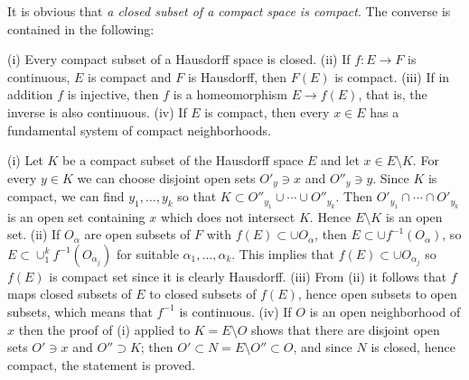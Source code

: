 It is obvious that \emph{a closed subset of a compact space is
  compact}. The converse is contained in the following:
\begin{thm}\label{thm:2.1.3}
  (i) Every compact subset of a Hausdorff space is closed. (ii) If
  $f:E\to F$ is continuous, $E$ is compact and $F$ is Hausdorff, then
  $F(E)$ is compact. (iii) If in addition $f$ is injective, then $f$
  is a homeomorphism $E\to f(E)$, that is, the inverse is also
  continuous. (iv) If $E$ is compact, then every $x\in E$ has a
  fundamental system of compact neighborhoods.
\end{thm}
\begin{prf}
  (i) Let $K$ be a compact subset of the Hausdorff space $E$ and let
  $x\in E\setminus K$. For every $y\in K$ we can choose disjoint open
  sets $O'_y\ni x$ and $O''_y\ni y$. Since $K$ is compact, we can find
  $y_1,\dots,y_k$ so that $K\subset O''_{y_1}\cup\cdots\cup O''_{y_k}
  $. Then $O'_{y_1}\cap\cdots\cap O'_{y_k}$ is an open set containing
  $x$ which does not intersect $K$. Hence $E\setminus K$ is an open
  set. (ii) If $O_{\alpha}$ are open subsets of $F$ with
  $f(E)\subset\cup O_{\alpha}$, then $E\subset\cup
  f^{-1}(O_{\alpha})$, so $E\subset\cup_1^kf^{-1}(O_{\alpha_j})$ for
  suitable $\alpha_1,\dots,\alpha_k$. This implies that
  $f(E)\subset\cup O_{\alpha_j}$ so $f(E)$ is compact set since it is
  clearly Hausdorff. (iii) From (ii) it follows that $f$ maps closed
  subsets of $E$ to closed subsets of $f(E)$, hence open subsets to
  open subsets, which means that $f^{-1}$ is continuous. (iv) If $O$
  is an open neighborhood of $x$ then the proof of (i) applied to
  $K=E\setminus O$ shows that there are disjoint open sets $O'\ni x$
  and $O''\supset K$; then $O'\subset N=E\setminus O''\subset O$, and
  since $N$ is closed, hence compact, the statement is proved.
\end{prf}

